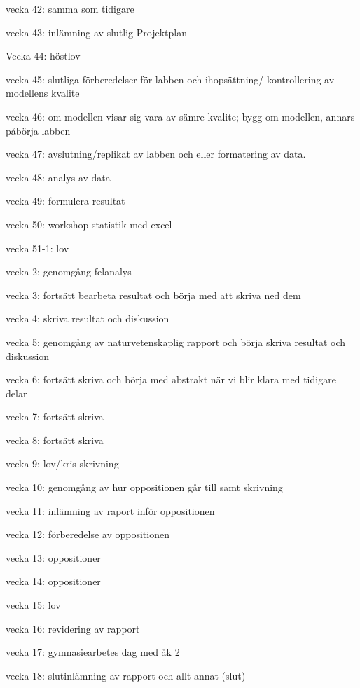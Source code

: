 vecka 42: samma som tidigare

vecka 43: inlämning av slutlig Projektplan

Vecka 44: höstlov

vecka 45: slutliga förberedelser för labben och ihopsättning/ kontrollering av modellens kvalite

vecka 46: om modellen visar sig vara av sämre kvalite; bygg om modellen, annars påbörja labben

vecka 47: avslutning/replikat av labben och eller formatering av data.

vecka 48: analys av data

vecka 49: formulera resultat

vecka 50: workshop statistik med excel

vecka 51-1: lov

vecka 2: genomgång felanalys

vecka 3: fortsätt bearbeta resultat och börja med att skriva ned dem

vecka 4: skriva resultat och diskussion

vecka 5: genomgång av naturvetenskaplig rapport och börja skriva resultat och diskussion

vecka 6: fortsätt skriva och börja med abstrakt när vi blir klara med tidigare delar

vecka 7: fortsätt skriva

vecka 8: fortsätt skriva

vecka 9: lov/kris skrivning

vecka 10: genomgång av hur oppositionen går till samt skrivning

vecka 11: inlämning av raport inför oppositionen

vecka 12: förberedelse av oppositionen

vecka 13: oppositioner

vecka 14: oppositioner

vecka 15: lov

vecka 16: revidering av rapport

vecka 17: gymnasiearbetes dag med åk 2

vecka 18: slutinlämning av rapport och allt annat (slut)